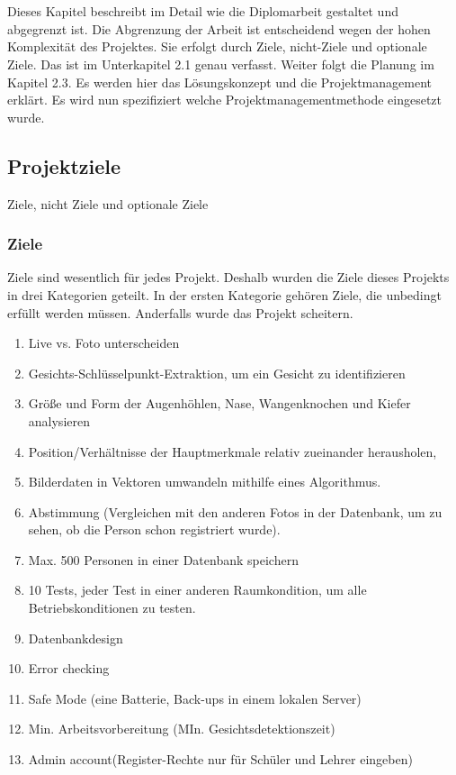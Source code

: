 \chapter{\docname}
\label{\docname}
Dieses Kapitel beschreibt im Detail wie die Diplomarbeit gestaltet und abgegrenzt ist. Die Abgrenzung der Arbeit ist entscheidend wegen der hohen Komplexität des Projektes. Sie erfolgt durch Ziele, nicht-Ziele und optionale Ziele. Das ist im Unterkapitel 2.1 genau verfasst. 
Weiter folgt die Planung im Kapitel 2.3. Es werden hier das Lösungskonzept und die Projektmanagement erklärt. Es wird nun spezifiziert welche Projektmanagementmethode eingesetzt wurde.
\newcommand{\autor}{Rei Hoxha}
\section{Projektziele}
Ziele, nicht Ziele und optionale Ziele
\subsection{Ziele}
Ziele sind wesentlich für jedes Projekt. Deshalb wurden die Ziele dieses Projekts in drei Kategorien geteilt.
In der ersten Kategorie gehören Ziele, die unbedingt erfüllt werden müssen. Anderfalls wurde das Projekt scheitern.
\begin{enumerate}
	\item Live vs. Foto unterscheiden
	\item Gesichts-Schlüsselpunkt-Extraktion, um ein Gesicht zu identifizieren  

\item Größe und Form der Augenhöhlen, Nase, Wangenknochen und Kiefer analysieren 

\item Position/Verhältnisse der Hauptmerkmale relativ zueinander herausholen, 

\item Bilderdaten in Vektoren umwandeln mithilfe eines Algorithmus. 

\item Abstimmung (Vergleichen mit den anderen Fotos in der Datenbank, um zu sehen, ob die Person schon registriert wurde). 

\item Max. 500 Personen in einer Datenbank speichern

\item 10 Tests, jeder Test in einer anderen Raumkondition, um    alle Betriebskonditionen zu testen. 

\item Datenbankdesign 

\item Error checking

\item Safe Mode (eine Batterie, Back-ups in einem lokalen         Server) 

\item Min. Arbeitsvorbereitung (MIn. Gesichtsdetektionszeit)
\item Admin account(Register-Rechte nur für Schüler und Lehrer eingeben) 

\end{enumerate}
